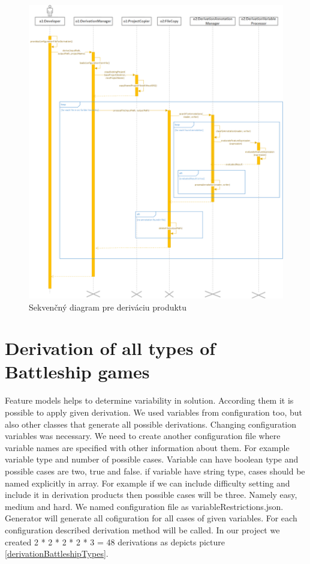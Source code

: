 \documentclass[11pt,slovak,a4paper,twoside]{article}
\begin{document}
\begin{figure}[!t]  %
					\begin{center}
									\includegraphics[width=\linewidth]{fig/derivationProcess.png}
									\caption{Sekvenčný diagram pre deriváciu produktu}
									\label{derivationProductSequenceDiagram}
					\end{center}
\end{figure}


\section{Derivation of all types of Battleship games} \label{engineAsSubsystem}

Feature models helps to determine variability in solution. According them it is possible to apply given derivation. We used variables from configuration too, but also other classes that generate all possible derivations. Changing configuration variables was necessary. We need to create another configuration file where variable names are specified with other information about them. For example variable type and number of possible cases. Variable can have boolean type and possible cases are two, true and false. if variable have string type, cases should be named explicitly in array. For example if we can include difficulty setting and include it in derivation products then possible cases will be three. Namely easy, medium and hard. We named configuration file as variableRestrictions.json. Generator will generate all cofiguration for all cases of given variables. For each configuration described derivation method will be called. In our project we created 2 * 2 * 2 * 2 * 3 = 48 derivations as depicts picture \ref{derivationBattleshipTypes}.  
\end{document}
